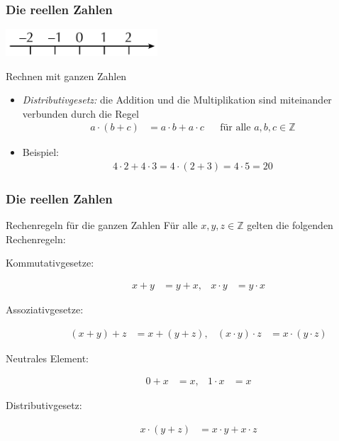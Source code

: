 \documentclass{beamer}
\renewcommand{\emph}[1]{{\textcolor{solarizedRed}{\itshape #1}}}
\newcommand\ZZ{\mathbb Z}
\newcommand{\ue}{\"u}
\newcommand{\mytitle}{Die reellen Zahlen}
\begin{document}
\begin{frame}\frametitle{\mytitle}
	\hfill\includegraphics[height=10mm]{pics/integers.pdf}
	\begin{block}{Rechnen mit ganzen Zahlen}
		\begin{itemize}
			\item \emph{Distributivgesetz:} 
				die Addition und die Multiplikation sind miteinander verbunden durch die Regel
				\begin{align*}
					a\cdot(b+c)&=a\cdot b+a\cdot c&&\mbox{f\ue r alle }a,b,c\in\ZZ
				\end{align*}
			\item \alert{Beispiel:}
				\begin{align*}
					4\cdot2+4\cdot3=4\cdot(2+3)=4\cdot 5=20
				\end{align*}
		\end{itemize}
	\end{block}
\end{frame}

\begin{frame}\frametitle{\mytitle}
	\begin{block}{Rechenregeln f\ue r die ganzen Zahlen}
		F\ue r alle $x,y,z\in\ZZ$ gelten die folgenden Rechenregeln:
		\begin{description}
			\item[Kommutativgesetze:] 
					\begin{align*}
						x+y&=y+x,&x\cdot y&=y\cdot x
			\end{align*}
			\item[Assoziativgesetze:]	
				\begin{align*}
					(x+y)+z&=x+(y+z),&(x\cdot y)\cdot z&=x\cdot(y\cdot z)
				\end{align*}
			\item[Neutrales Element:]
				\begin{align*}
					0+x&=x,&1\cdot x&=x
				\end{align*}
			\item[Distributivgesetz:]
				\begin{align*}
					x\cdot(y+z)&=x\cdot y+x\cdot z
				\end{align*}
		\end{description}
	\end{block}
\end{frame}
\end{document}
